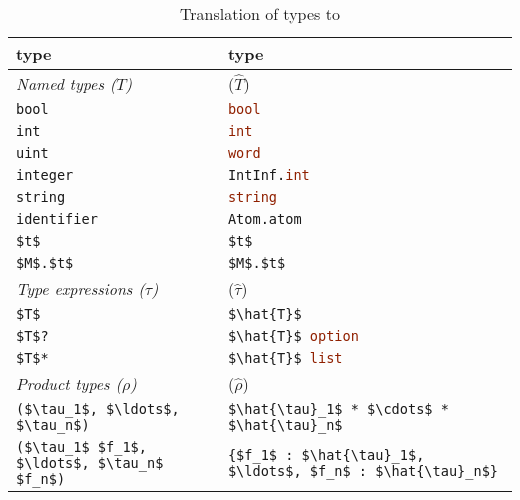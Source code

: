 \begin{table}[tp]
  \caption{Translation of \asdl{} types to \sml{}}
  \label{tbl:asdl-to-sml}
  \begin{center}
    \begin{tabular}{|l|p{3in}|}
      \hline
      \textbf{\asdl{} type} & \textbf{\sml{} type} \\
      \hline
      \textit{Named types ($T$)} &  ($\hat{T}$) \\[0.25em]
      \lstinline!bool! & \lstinline[language=SML]!bool! \\[0.5em]
      \lstinline!int! & \lstinline[language=SML]!int! \\[0.5em]
      \lstinline!uint! & \lstinline[language=SML]!word! \\[0.5em]
      \lstinline!integer! & \lstinline[language=SML]!IntInf.int! \\[0.5em]
      \lstinline!string! & \lstinline[language=SML]!string! \\[0.5em]
      \lstinline!identifier! & \lstinline[language=SML]!Atom.atom! \\[0.5em]
      \lstinline[language=ASDL,mathescape=true]@$t$@ & \lstinline[language=SML,mathescape=true]!$t$! \\[0.5em]
      \lstinline[language=ASDL,mathescape=true]@$M$.$t$@ & \lstinline[language=SML,mathescape=true]!$M$.$t$! \\[0.5em]
      \hline
      \textit{Type expressions ($\tau$)} &  ($\hat{\tau}$) \\[0.25em]
      \lstinline[language=ASDL,mathescape=true]@$T$@ & \lstinline[language=SML,mathescape=true]!$\hat{T}$! \\[0.5em]
      \lstinline[language=ASDL,mathescape=true]@$T$?@ & \lstinline[language=SML,mathescape=true]!$\hat{T}$ option! \\[0.5em]
      \lstinline[language=ASDL,mathescape=true]@$T$*@ & \lstinline[language=SML,mathescape=true]!$\hat{T}$ list! \\[0.5em]
      \hline
      \textit{Product types ($\rho$)} & ($\hat{\rho}$) \\[0.25em]
      \lstinline[language=ASDL,mathescape=true]@($\tau_1$, $\ldots$, $\tau_n$)@
        & \lstinline[language=SML,mathescape=true]!$\hat{\tau}_1$ * $\cdots$ * $\hat{\tau}_n$! \\[0.5em]
      \lstinline[language=ASDL,mathescape=true]@($\tau_1$ $f_1$, $\ldots$, $\tau_n$ $f_n$)@
        & \lstinline[language=SML,mathescape=true]!{$f_1$ : $\hat{\tau}_1$, $\ldots$, $f_n$ : $\hat{\tau}_n$}! \\[0.5em]

\end{tabular}
\end{center}
\end{table}
